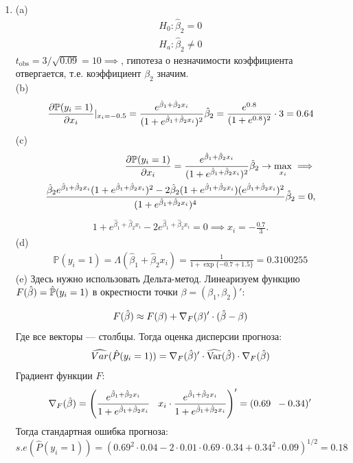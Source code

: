 \documentclass[12pt, a4paper]{article}
\begin{document}
\begin{enumerate}
\item
(a)
\begin{eqnarray}
H_0: \hat\beta_2 = 0 \\
H_a: \hat\beta_2 \neq 0
\end{eqnarray}
$t_{\mathrm{obs}} = 3 / \sqrt{0.09} = 10 \implies$, гипотеза о незначимости коэффициента отвергается, т.е. коэффициент $\beta_2$ значим. \\
(b)
\begin{eqnarray}
 \frac{\partial \mathbb{P}(y_i = 1)}{\partial x_i} |_{x_i = -0.5} = \frac {e^{\hat\beta_1 + \hat\beta_2 x_i}}{(1+ e^{\hat\beta_1 + \hat\beta_2 x_i})^2}\hat{\beta}_2 = \frac{e^{0.8}}{(1+e^{0.8})^2}\cdot3 = 0.64
\end{eqnarray}
(c)
\begin{eqnarray}
 \frac{\partial \mathbb{P}(y_i = 1)}{\partial x_i} = \frac {e^{\hat\beta_1 + \hat\beta_2 x_i}}{(1+ e^{\hat\beta_1 + \hat\beta_2 x_i})^2}\hat{\beta}_2 \to \max_{x_i} \implies \\
 \frac{\hat\beta_2 e^{\hat\beta_1 + \hat\beta_2 x_i} (1+ e^{\hat\beta_1 + \hat\beta_2 x_i})^2 - 2\hat\beta_2(1+ e^{\hat\beta_1 + \hat\beta_2 x_i})(e^{\hat\beta_1 + \hat\beta_2x_i})^2}{(1+ e^{\hat\beta_1 + \hat\beta_2 x_i})^4}\hat{\beta}_2 = 0,
\end{eqnarray}
\begin{eqnarray}
1 + e^{\hat\beta_1 + \hat\beta_2 x_i} - 2e^{\hat\beta_1 + \hat\beta_2 x_i} = 0 \implies x_i = -\frac{0.7}{3}.
\end{eqnarray}
(d)
\begin{eqnarray}
\mathbb{P}(y_i =1) = \Lambda(\hat\beta_1 + \hat\beta_2 x_i) = \frac 1{1 + \exp\{-0.7 + 1.5\}} = 0.3100255
\end{eqnarray}
(e) Здесь нужно использовать Дельта-метод. Линеаризуем функцию $F(\hat{\beta}) = \hat{\mathbb{P}}(y_i = 1) $ в окрестности точки $\beta = (\beta_1, \beta_2)'$:

\[
F(\hat{\beta}) \approx F(\beta) +   \nabla_F(\beta)'   \cdot (\hat{\beta} - \beta )
\]
Где все векторы — столбцы. Тогда оценка дисперсии прогноза:
\[
\widehat{Var}(\hat{P}(y_i = 1)) = \nabla_F(\hat{\beta})' \cdot \widehat{\operatorname{Var}}(\hat{\beta}) \cdot \nabla_F(\hat{\beta})
\]
Градиент функции $F$:
\[
\nabla_F(\hat{\beta}) = \left( \frac{e^{\hat{\beta}_1 + \hat{\beta}_2 x_i}}{1 + e^{\hat{\beta}_1 + \hat{\beta}_2 x_i}} \hspace{3mm} x_i\cdot \frac{e^{\hat{\beta}_1 + \hat{\beta}_2 x_i}}{1 + e^{\hat{\beta}_1 + \hat{\beta}_2 x_i}}\right)' = (0.69 \hspace{2mm}-0.34)'
\]
Тогда стандартная ошибка прогноза:
\[
s.e(\hat{P}(y_i = 1)) = ( 0.69^2 \cdot 0.04 - 2\cdot0.01\cdot0.69\cdot0.34 + 0.34^2 \cdot 0.09 )^{1/2} =  0.18
\]



\end{enumerate}
\end{document}
